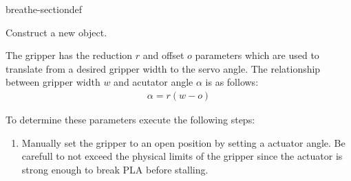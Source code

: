 \documentclass[letterpaper,10pt,english]{sphinxmanual}
\begin{document}
\begin{fulllineitems}
\begin{sphinxuseclass}{breathe-sectiondef}
\begin{fulllineitems}
\label{\detokenize{code/bioscara_hardware_drivers/index:_CPPv4N25bioscara_hardware_drivers25bioscara_hardware_drivers11BaseGripper11BaseGripperEfffff}}\label{\detokenize{code/bioscara_hardware_drivers/index:_CPPv3N25bioscara_hardware_drivers25bioscara_hardware_drivers11BaseGripper11BaseGripperEfffff}}\label{\detokenize{code/bioscara_hardware_drivers/index:_CPPv2N25bioscara_hardware_drivers25bioscara_hardware_drivers11BaseGripper11BaseGripperEfffff}}\label{\detokenize{code/bioscara_hardware_drivers/index:bioscara_hardware_drivers::bioscara_hardware_drivers::BaseGripper::BaseGripper__float.float.float.float.float}}
\pysigstartsignatures
\pysigstartmultiline
\pysiglinewithargsret
{\label{\detokenize{code/bioscara_hardware_drivers/index:classbioscara__hardware__drivers_1_1BaseGripper_1a5e48cae19cd98b836e874370384fd7f0}}}
{\sphinxparamcomma {}\sphinxparamcomma {}\sphinxparamcomma {}\sphinxparamcomma {}}
{}
\pysigstopmultiline
\pysigstopsignatures
\sphinxAtStartPar
Construct a new {\hyperref[\detokenize{code/bioscara_hardware_drivers/index:classbioscara__hardware__drivers_1_1BaseGripper}]{}} object. 

\sphinxAtStartPar
The gripper has the reduction \(r\) and offset \(o\) parameters which are used to translate from a desired gripper width to the servo angle. The relationship between gripper width \(w\) and acutator angle \(\alpha\) is as follows:  \begin{equation*}
\begin{split}
  \alpha = r (w-o)
  \end{split}
\end{equation*}

\sphinxAtStartPar
To determine these parameters execute the following steps:

\sphinxAtStartPar
\begin{enumerate}
%
\item {} 
\sphinxAtStartPar
Manually set the gripper to an open position by setting a actuator angle. Be carefull to not exceed the physical limits of the gripper since the actuator is strong enough to break PLA before stalling.


\end{enumerate}
\end{fulllineitems}
\end{sphinxuseclass}
\end{fulllineitems}
\end{document}
